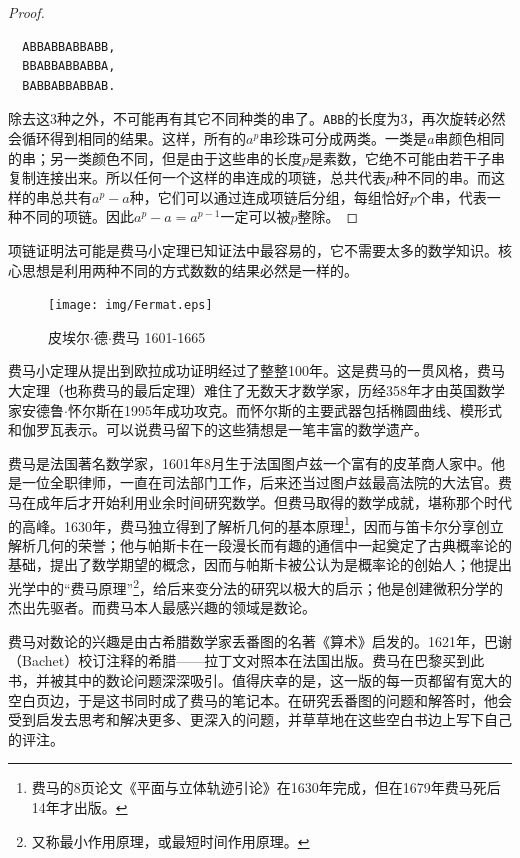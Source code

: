 \documentclass{article}
\begin{document}
\begin{proof}
\begin{verbatim}
  ABBABBABBABB,
  BBABBABBABBA,
  BABBABBABBAB.
\end{verbatim}

除去这3种之外，不可能再有其它不同种类的串了。\texttt{ABB}的长度为3，再次旋转必然会循环得到相同的结果。这样，所有的$a^p$串珍珠可分成两类。一类是$a$串颜色相同的串；另一类颜色不同，但是由于这些串的长度$p$是素数，它绝不可能由若干子串复制连接出来。所以任何一个这样的串连成的项链，总共代表$p$种不同的串。而这样的串总共有$a^p - a$种，它们可以通过连成项链后分组，每组恰好$p$个串，代表一种不同的项链。因此$a^p-a = a^{p-1}$一定可以被$p$整除。
\end{proof}

项链证明法可能是费马小定理已知证法中最容易的，它不需要太多的数学知识。核心思想是利用两种不同的方式数数的结果必然是一样的。

\begin{figure}
  \centering %
 \texttt{[image: img/Fermat.eps]}
 \captionsetup{labelformat=empty}
 \caption{皮埃尔$\cdot$德$\cdot$费马 1601-1665}
 \label{fig:Fermat}
\end{figure}

费马小定理从提出到欧拉成功证明经过了整整100年。这是费马的一贯风格，费马大定理（也称费马的最后定理）难住了无数天才数学家，历经358年才由英国数学家安德鲁$\cdot$怀尔斯在1995年成功攻克。而怀尔斯的主要武器包括椭圆曲线、模形式和伽罗瓦表示\cite{HanXueTao2009}。可以说费马留下的这些猜想是一笔丰富的数学遗产。

\vspace{5mm}

费马是法国著名数学家，1601年8月生于法国图卢兹一个富有的皮革商人家中。他是一位全职律师，一直在司法部门工作，后来还当过图卢兹最高法院的大法官。费马在成年后才开始利用业余时间研究数学。但费马取得的数学成就，堪称那个时代的高峰。1630年，费马独立得到了解析几何的基本原理\footnote{费马的8页论文《平面与立体轨迹引论》在1630年完成，但在1679年费马死后14年才出版。}，因而与笛卡尔分享创立解析几何的荣誉；他与帕斯卡在一段漫长而有趣的通信中一起奠定了古典概率论的基础，提出了数学期望的概念，因而与帕斯卡被公认为是概率论的创始人；他提出光学中的“费马原理”\footnote{又称最小作用原理，或最短时间作用原理。}，给后来变分法的研究以极大的启示；他是创建微积分学的杰出先驱者。而费马本人最感兴趣的领域是数论。

费马对数论的兴趣是由古希腊数学家丢番图的名著《算术》启发的。1621年，巴谢（Bachet）校订注释的希腊——拉丁文对照本在法国出版。费马在巴黎买到此书，并被其中的数论问题深深吸引。值得庆幸的是，这一版的每一页都留有宽大的空白页边，于是这书同时成了费马的笔记本。在研究丢番图的问题和解答时，他会受到启发去思考和解决更多、更深入的问题，并草草地在这些空白书边上写下自己的评注。
\end{document}
